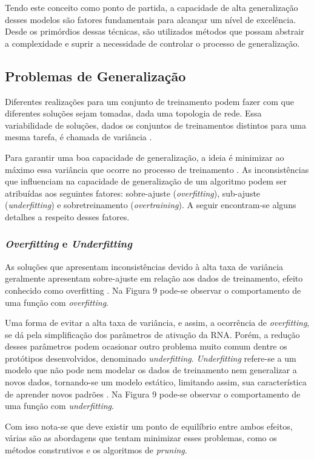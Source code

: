 Tendo este conceito como ponto de partida, a capacidade de alta generalização desses modelos são fatores fundamentais para alcançar um nível de excelência. Desde os primórdios dessas técnicas, são utilizados métodos que possam abstrair a complexidade e suprir a necessidade de controlar o processo de generalização.

\subsection{Problemas de Generalização}
 Diferentes realizações para um conjunto de treinamento podem fazer com que diferentes soluções sejam tomadas, dada uma topologia de rede. Essa variabilidade de soluções, dados os conjuntos de treinamentos distintos para uma mesma tarefa, é chamada de variância \cite{haykin2000}.
 
Para garantir uma boa capacidade de generalização, a ideia é minimizar ao máximo essa variância que ocorre no processo de treinamento \cite{medeiros}. As inconsistências que influenciam  na capacidade de generalização de um algoritmo podem ser atribuídas aos seguintes fatores: sobre-ajuste (\textit{overfitting}), sub-ajuste (\textit{underfitting}) e sobretreinamento (\textit{overtraining}). A seguir encontram-se alguns detalhes a respeito desses fatores.

\subsubsection{\textit{Overfitting} e \textit{Underfitting}}
As soluções que apresentam inconsistências devido à alta taxa de variância geralmente apresentam sobre-ajuste em relação aos dados de treinamento, efeito conhecido como overfitting \cite{medeiros}. Na Figura 9 pode-se observar o comportamento de uma função com \textit{overfitting}.

Uma forma de evitar a alta taxa de variância, e assim, a ocorrência de \textit{overfitting}, se dá pela simplificação dos parâmetros de ativação da RNA. Porém, a redução desses parâmetros podem ocasionar outro problema muito comum dentre os protótipos desenvolvidos, denominado \textit{underfitting}. \textit{Underfitting} refere-se a um modelo que não pode nem modelar os dados de treinamento nem generalizar a novos dados, tornando-se um modelo estático, limitando assim, sua característica de aprender novos padrões \cite{geman}. Na Figura 9 pode-se observar o comportamento de uma função com \textit{underfitting}.

Com isso nota-se que deve existir um ponto de equilíbrio entre ambos efeitos, várias são as abordagens que tentam minimizar esses problemas, como os métodos construtivos e os algoritmos de \textit{pruning}.

